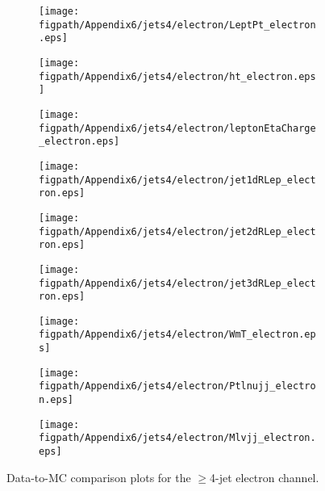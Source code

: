 \begin{figure}[!hbtp]
    \centering
    \begin{subfigure}[t]{0.317\textwidth}
        \texttt{[image: \\figpath/Appendix6/jets4/electron/LeptPt\_electron.eps]}
    \end{subfigure}
    \begin{subfigure}[t]{0.317\textwidth}
        \texttt{[image: \\figpath/Appendix6/jets4/electron/ht\_electron.eps]}
    \end{subfigure}
    \begin{subfigure}[t]{0.317\textwidth}
        \texttt{[image: \\figpath/Appendix6/jets4/electron/leptonEtaCharge\_electron.eps]}
    \end{subfigure}

    \begin{subfigure}[t]{0.317\textwidth}
        \texttt{[image: \\figpath/Appendix6/jets4/electron/jet1dRLep\_electron.eps]}
    \end{subfigure}
    \begin{subfigure}[t]{0.317\textwidth}
        \texttt{[image: \\figpath/Appendix6/jets4/electron/jet2dRLep\_electron.eps]}
    \end{subfigure}
    \begin{subfigure}[t]{0.317\textwidth}
        \texttt{[image: \\figpath/Appendix6/jets4/electron/jet3dRLep\_electron.eps]}
    \end{subfigure}

    \begin{subfigure}[t]{0.317\textwidth}
        \texttt{[image: \\figpath/Appendix6/jets4/electron/WmT\_electron.eps]}
    \end{subfigure}
    \begin{subfigure}[t]{0.317\textwidth}
        \texttt{[image: \\figpath/Appendix6/jets4/electron/Ptlnujj\_electron.eps]}
    \end{subfigure}
    \begin{subfigure}[t]{0.317\textwidth}
        \texttt{[image: \\figpath/Appendix6/jets4/electron/Mlvjj\_electron.eps]}
    \end{subfigure}
    \caption{Data-to-MC comparison plots for the $\geqslant$4-jet electron channel.}
    \label{fig:comparison_plots_jets4_electron_2}
\end{figure}
























